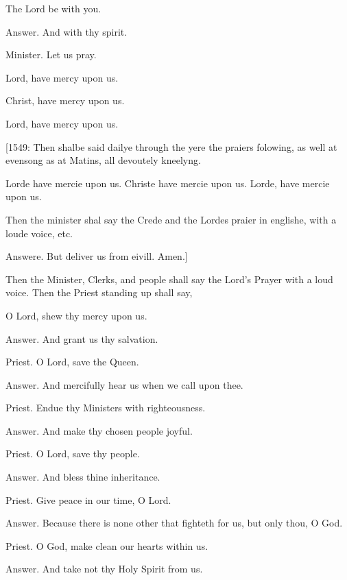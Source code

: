    The Lord be with you.

    Answer. And with thy spirit.

    Minister. Let us pray.

    Lord, have mercy upon us.

       Christ, have mercy upon us.

    Lord, have mercy upon us.

[1549: Then shalbe said dailye through the yere the praiers folowing, as well at evensong as at Matins, all devoutely kneelyng.

Lorde have mercie upon us. Christe have mercie upon us. Lorde, have mercie upon us.

Then the minister shal say the Crede and the Lordes praier in englishe, with a loude voice, etc.

Answere.
But deliver us from eivill. Amen.]


Then the Minister, Clerks, and people shall say the Lord's Prayer with a loud voice.
Then the Priest standing up shall say,

    O Lord, shew thy mercy upon us.

    Answer. And grant us thy salvation.

    Priest. O Lord, save the Queen.

    Answer. And mercifully hear us when we call upon thee.

    Priest. Endue thy Ministers with righteousness.

    Answer. And make thy chosen people joyful.

    Priest. O Lord, save thy people.

    Answer. And bless thine inheritance.

    Priest. Give peace in our time, O Lord.

    Answer. Because there is none other that fighteth for us, but only thou, O God.

    Priest. O God, make clean our hearts within us.

    Answer. And take not thy Holy Spirit from us.

